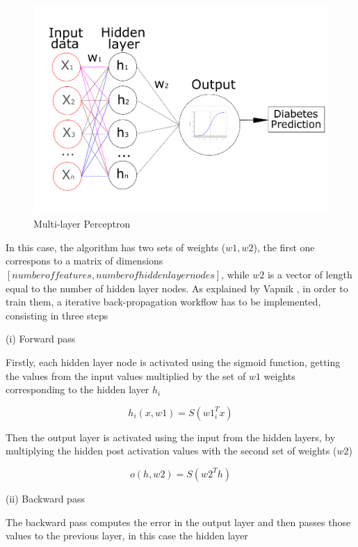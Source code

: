 \documentclass[10pt,twocolumn,letterpaper]{article}
\begin{document}
\begin{figure}[h]
	\begin{center}
		\includegraphics[width=1.0\linewidth]{Figura.pdf}
	\end{center}
	\caption{Multi-layer Perceptron}
	\label{fig:mlp}
\end{figure}


In this case, the algorithm has two sets of weights ($w1, w2$), the first one correspons to a matrix of dimensions $[number of features, number of hidden layer nodes]$, while $w2$ is a vector of length equal to the number of hidden layer nodes. As explained by Vapnik \cite{Vapnik1995}, in order to train them, a iterative back-propagation workflow has to be implemented, consisting in three steps

(i) Forward pass

Firstly, each hidden layer node is activated using the sigmoid function, getting the values from the input values multiplied by the set of $w1$ weights corresponding to the hidden layer $h_i$

\begin{equation}
h_i(x,w1) = S(w1_i^T x)
\end{equation}

Then the output layer is activated using the input from the hidden layers, by multiplying the hidden post activation values with the second set of weights ($w2$)

\begin{equation}
o(h,w2) = S(w2^T h)
\end{equation}

(ii) Backward pass

The backward pass computes the error in the output layer and then passes those values to the previous layer, in this case the hidden layer
\end{document}
